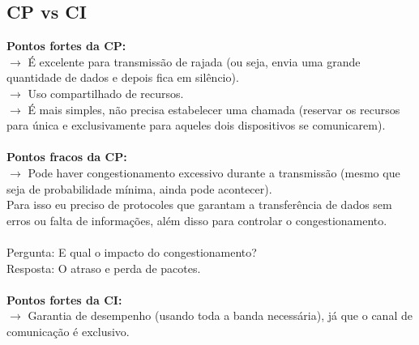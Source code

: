 \documentclass[12pt]{article}
\begin{document}
    \subsection{CP vs CI}
    \textbf{Pontos fortes da CP:}
    \\$\rightarrow$ É excelente para transmissão de rajada (ou seja, envia uma grande quantidade de dados e depois fica em silêncio).
    \\$\rightarrow$ Uso compartilhado de recursos.
    \\$\rightarrow$ É mais simples, não precisa estabelecer uma chamada (reservar os recursos para única e exclusivamente para aqueles dois dispositivos se comunicarem).
    \\~\\\textbf{Pontos fracos da CP:}
    \\$\rightarrow$ Pode haver congestionamento excessivo durante a transmissão (mesmo que seja de probabilidade mínima, ainda pode acontecer). 
    \\Para isso eu preciso de protocoles que garantam a transferência de dados sem erros ou falta de informações, além disso para controlar o congestionamento.
    \\~\\Pergunta: E qual o impacto do congestionamento? 
    \\Resposta: O atraso e perda de pacotes.
    \\~\\\textbf{Pontos fortes da CI:}
    \\$\rightarrow$ Garantia de desempenho (usando toda a banda necessária), já que o canal de comunicação é exclusivo.

\end{document}
